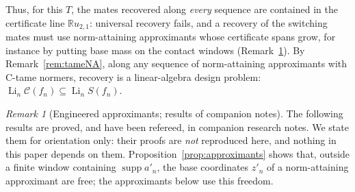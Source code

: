 \documentclass[10pt]{amsart}
\theoremstyle{definition}
\theoremstyle{remark}
\newtheorem{remark}[theorem]{Remark}
\newcommand{\supp}{\operatorname{supp}}
\newcommand{\R}{\mathbb R}
\newcommand{\Cset}{\mathcal C}
\newcommand{\Li}{\operatorname*{Li}}
\begin{document}
Thus, for this $T$, the mates recovered along \emph{every} sequence are
contained in the certificate line $\R u_{2,1}$: universal recovery fails, and
a recovery of the switching mates must use norm-attaining approximants whose
certificate spans grow, for instance by putting base mass on the contact
windows (Remark~\ref{rem:engineered}).  By Remark~\ref{rem:tameNA}, along
any sequence of norm-attaining approximants with C-tame normers, recovery is
a linear-algebra design problem: $\Li_n\Cset(f_n)\subseteq\Li_nS(f_n)$.

\begin{remark}[Engineered approximants; results of companion notes]\label{rem:engineered}
The following results are proved, and have been refereed, in companion
research notes.  We state them for orientation only: their proofs are
\emph{not} reproduced here, and nothing in this paper depends on them.
Proposition~\ref{prop:approximants} shows that, outside a finite window
containing $\supp a'_n$, the base coordinates $z'_n$ of a norm-attaining
approximant are free; the approximants below use this freedom.


\end{remark}
\end{document}
